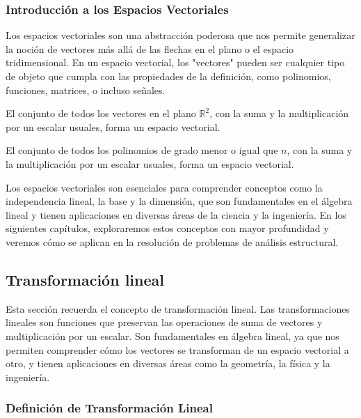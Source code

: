 \subsubsection{Introducción a los Espacios Vectoriales}

Los espacios vectoriales son una abstracción poderosa que nos permite generalizar la noción de vectores más allá de las flechas en el plano o el espacio tridimensional.  En un espacio vectorial, los "vectores" pueden ser cualquier tipo de objeto que cumpla con las propiedades de la definición, como polinomios, funciones, matrices, o incluso señales.

\begin{example}
	El conjunto de todos los vectores en el plano $\mathbb{R}^2$, con la suma y la multiplicación por un escalar usuales, forma un espacio vectorial.
\end{example}

\begin{example}
	El conjunto de todos los polinomios de grado menor o igual que $n$, con la suma y la multiplicación por un escalar usuales, forma un espacio vectorial.
\end{example}

Los espacios vectoriales son esenciales para comprender conceptos como la independencia lineal, la base y la dimensión, que son fundamentales en el álgebra lineal y tienen aplicaciones en diversas áreas de la ciencia y la ingeniería.  En los siguientes capítulos, exploraremos estos conceptos con mayor profundidad y veremos cómo se aplican en la resolución de problemas de análisis estructural.

\subsection{Transformación lineal}

Esta sección recuerda el concepto de transformación lineal. Las transformaciones lineales son funciones que preservan las operaciones de suma de vectores y multiplicación por un escalar.  Son fundamentales en álgebra lineal, ya que nos permiten comprender cómo los vectores se transforman de un espacio vectorial a otro, y tienen aplicaciones en diversas áreas como la geometría, la física y la ingeniería.

\subsubsection{Definición de Transformación Lineal}

